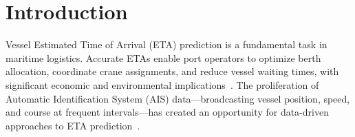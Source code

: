 \documentclass[sigconf,anonymous]{acmart}%
\begin{document}



\maketitle

\section{Introduction}

Vessel Estimated Time of Arrival (ETA) prediction is a fundamental task in maritime logistics.
Accurate ETAs enable port operators to optimize berth allocation, coordinate crane assignments, and reduce vessel waiting times, with significant economic and environmental implications~\cite{unctad2023}.
The proliferation of Automatic Identification System (AIS) data---broadcasting vessel position, speed, and course at frequent intervals---has created an opportunity for data-driven approaches to ETA prediction~\cite{fang2022}.
\end{document}
